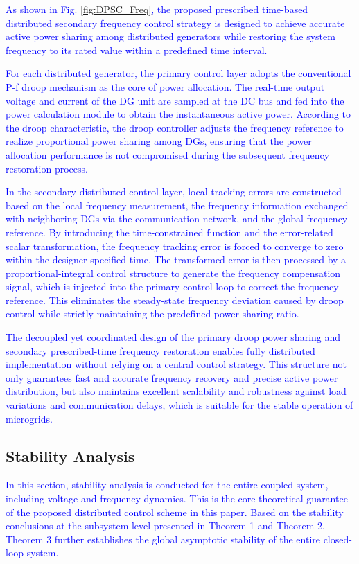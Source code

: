 \documentclass[]{interact}
\theoremstyle{plain}%
\theoremstyle{definition}
\theoremstyle{remark}
\begin{document}
\textcolor{blue}{As shown in Fig. \ref{fig:DPSC_Freq}, the proposed prescribed time-based distributed secondary frequency control strategy is designed to achieve accurate active power sharing among distributed generators while restoring the system frequency to its rated value within a predefined time interval.}

\textcolor{blue}{For each distributed generator, the primary control layer adopts the conventional P-f droop mechanism as the core of power allocation. The real-time output voltage and current of the DG unit are sampled at the DC bus and fed into the power calculation module to obtain the instantaneous active power. According to the droop characteristic, the droop controller adjusts the frequency reference to realize proportional power sharing among DGs, ensuring that the power allocation performance is not compromised during the subsequent frequency restoration process.}

\textcolor{blue}{In the secondary distributed control layer, local tracking errors are constructed based on the local frequency measurement, the frequency information exchanged with neighboring DGs via the communication network, and the global frequency reference. By introducing the time-constrained function and the error-related scalar transformation, the frequency tracking error is forced to converge to zero within the designer-specified time. The transformed error is then processed by a proportional-integral control structure to generate the frequency compensation signal, which is injected into the primary control loop to correct the frequency reference. This eliminates the steady-state frequency deviation caused by droop control while strictly maintaining the predefined power sharing ratio.}

\textcolor{blue}{The decoupled yet coordinated design of the primary droop power sharing and secondary prescribed-time frequency restoration enables fully distributed implementation without relying on a central control strategy. This structure not only guarantees fast and accurate frequency recovery and precise active power distribution, but also maintains excellent scalability and robustness against load variations and communication delays, which is suitable for the stable operation of microgrids.}

\subsection{Stability Analysis}
\textcolor{blue}{In this section, stability analysis is conducted for the entire coupled system, including voltage and frequency dynamics. This is the core theoretical guarantee of the proposed distributed control scheme in this paper. Based on the stability conclusions at the subsystem level presented in Theorem 1 and Theorem 2, Theorem 3 further establishes the global asymptotic stability of the entire closed-loop system.}
\end{document}
